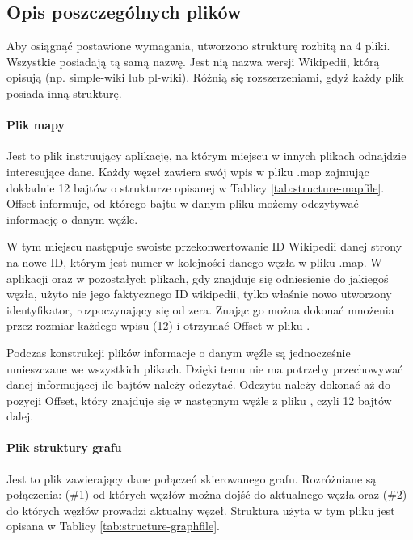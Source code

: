 \subsection{Opis poszczególnych plików}
Aby osiągnąć postawione wymagania, utworzono strukturę rozbitą na 4 pliki. Wszystkie posiadają tą samą nazwę. Jest nią nazwa wersji Wikipedii, którą opisują (np. simple-wiki lub pl-wiki). Różnią się rozszerzeniami, gdyż każdy plik posiada inną strukturę.

\paragraph{Plik mapy }
Jest to plik instruujący aplikację, na którym miejscu w innych plikach odnajdzie interesujące dane. Każdy węzeł zawiera swój wpis w pliku .map zajmując dokładnie 12 bajtów o strukturze opisanej w Tablicy \ref{tab:structure-mapfile}. Offset informuje, od którego bajtu w danym pliku możemy odczytywać informację o danym węźle.


W tym miejscu następuje swoiste przekonwertowanie ID Wikipedii danej strony na nowe ID, którym jest numer w kolejności danego węzła w pliku .map. W aplikacji oraz w pozostałych plikach, gdy znajduje się odniesienie do jakiegoś węzła, użyto nie jego faktycznego ID wikipedii, tylko właśnie nowo utworzony identyfikator, rozpoczynający się od zera. Znając go można dokonać mnożenia przez rozmiar każdego wpisu (12) i otrzymać Offset w pliku .

Podczas konstrukcji plików informacje o danym węźle są jednocześnie umieszczane we wszystkich plikach. Dzięki temu nie ma potrzeby przechowywać danej informującej ile bajtów należy odczytać. Odczytu należy dokonać aż do pozycji Offset, który znajduje się w następnym węźle z pliku , czyli 12 bajtów dalej.

\paragraph{Plik struktury grafu }

Jest to plik zawierający dane połączeń skierowanego grafu. Rozróżniane są połączenia: (\#1) od których węzłów można dojść do aktualnego węzła oraz (\#2) do których węzłów prowadzi aktualny węzeł. Struktura użyta w tym pliku jest opisana w Tablicy \ref{tab:structure-graphfile}.

